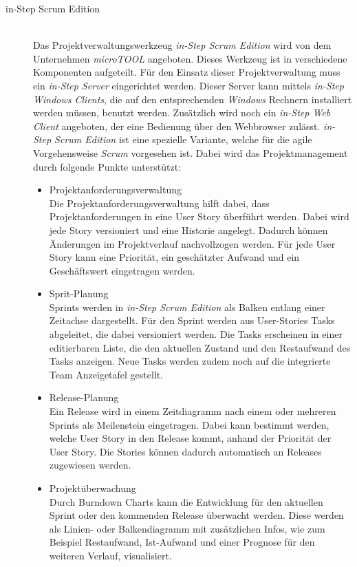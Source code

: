 \begin{description}
\item[in-Step Scrum Edition]\hspace*{1em}\\
Das Projektverwaltungswerkzeug \emph{in-Step Scrum Edition} wird von dem Unternehmen \emph{microTOOL} angeboten. Dieses Werkzeug ist in verschiedene Komponenten aufgeteilt. Für den Einsatz dieser Projektverwaltung muss ein \emph{in-Step Server} eingerichtet werden. Dieser Server kann mittels \emph{in-Step Windows Clients}, die auf den entsprechenden \emph{Windows} Rechnern installiert werden müssen, benutzt werden. Zusätzlich wird noch ein \emph{in-Step Web Client} angeboten, der eine Bedienung über den Webbrowser zulässt. \emph{in-Step Scrum Edition} ist eine spezielle Variante, welche für die agile Vorgehensweise \emph{Scrum} vorgesehen ist. Dabei wird das Projektmanagement durch folgende Punkte unterstützt:
\begin{itemize}
\item Projektanforderungsverwaltung\\
Die Projektanforderungsverwaltung hilft dabei, dass Projektanforderungen in eine User Story überführt werden. Dabei wird jede Story versioniert und eine Historie angelegt. Dadurch können Änderungen im Projektverlauf nachvollzogen werden. Für jede User Story kann eine Priorität, ein geschätzter Aufwand und ein Geschäftswert eingetragen werden.

\item Sprit-Planung\\
Sprints werden in \emph{in-Step Scrum Edition} als Balken entlang einer Zeitachse dargestellt. Für den Sprint werden aus User-Stories Tasks abgeleitet, die dabei versioniert werden. Die Tasks erscheinen in einer editierbaren Liste, die den aktuellen Zustand und den Restaufwand des Tasks anzeigen. Neue Tasks werden zudem noch auf die integrierte Team Anzeigetafel gestellt.

\item Release-Planung\\
Ein Release wird in einem Zeitdiagramm nach einem oder mehreren Sprints als Meilenstein eingetragen. Dabei kann bestimmt werden, welche User Story in den Release kommt, anhand der Priorität der User Story. Die Stories können dadurch automatisch an Releases zugewiesen werden. 

\item Projektüberwachung\\
Durch Burndown Charts kann die Entwicklung für den aktuellen Sprint oder den kommenden Release überwacht werden. Diese werden als Linien- oder Balkendiagramm mit zusätzlichen Infos, wie zum Beispiel Restaufwand, Ist-Aufwand und einer Prognose für den weiteren Verlauf, visualisiert.


\end{itemize}
\end{description}
